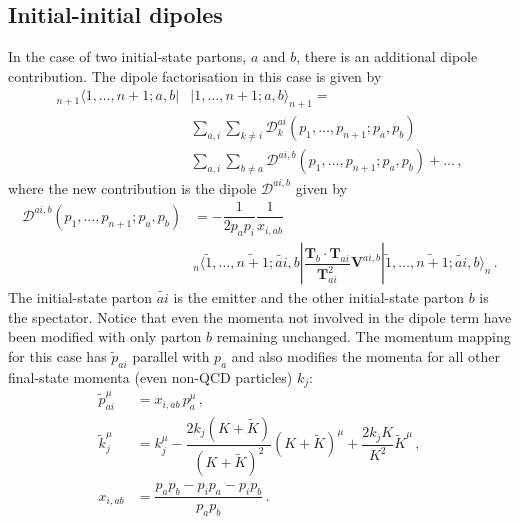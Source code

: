 \documentclass[main.tex]{subfiles}
\begin{document}
    \subsection{Initial-initial dipoles}
        In the case of two initial-state partons, $a$ and $b$, there
        is an additional dipole contribution. The dipole factorisation
        in this case is  given by
        \begin{equation}\label{eqn:II_factorisation}
            \begin{split}
                {}_{n+1} \langle 1, \ldots, n+1; a,b|&| 1, \ldots, n+1;a,b \rangle_{n+1} = \\
                &\sum_{a,i}\sum_{k \neq i} \mathcal{D}_{k}^{ai}(p_{1}, \ldots, p_{n+1};p_{a},p_{b}) \\
                &\sum_{a,i}\sum_{b \neq a} \mathcal{D}^{ai,b}(p_{1}, \ldots, p_{n+1};p_{a},p_{b}) + \ldots \, ,
            \end{split}
        \end{equation}
        where the new contribution is the dipole $\mathcal{D}^{ai,b}$ given by
        \begin{equation}\label{eqn:D_aib}
            \begin{split}
                \mathcal{D}^{ai,b}(p_{1},\ldots,p_{n+1};p_{a},p_{b}) &= -\dfrac{1}{2p_{a}p_{i}} \dfrac{1}{x_{i,ab}} \\
                &{}_{n}\langle \tilde{1}, \ldots, \widetilde{n+1}; \widetilde{ai}, b | \dfrac{\boldsymbol{T}_{b}\cdot\boldsymbol{T}_{ai}}{\boldsymbol{T}^{2}_{ai}}\boldsymbol{V}^{ai,b} | \tilde{1}, \ldots, \widetilde{n+1}; \widetilde{ai}, b \rangle_{n} \, .
            \end{split}
        \end{equation}
        The initial-state parton $\widetilde{ai}$ is the emitter and the
        other initial-state parton $b$ is the spectator. Notice that even the
        momenta not involved in the dipole term have been modified with only
        parton $b$ remaining unchanged. The momentum mapping for this case
        has $\tilde{p}_{ai}$ parallel with $p_{a}$ and also
        modifies the momenta for all other final-state momenta (even non-QCD particles) $k_{j}$:
        \begin{align}\label{eqn:II_mapping}
            \tilde{p}_{ai}^{\mu} &= x_{i,ab} \, p_{a}^{\mu} \, , \nonumber \\
            \tilde{k}_{j}^{\mu} &= k_{j}^{\mu} - \dfrac{2k_{j}(K+\widetilde{K})}{(K+\widetilde{K})^{2}}(K+\widetilde{K})^{\mu} + \dfrac{2k_{j}K}{K^{2}}\widetilde{K}^{\mu} \, , \\
            x_{i,ab} &= \dfrac{p_{a}p_{b} - p_{i}p_{a}-p_{i}p_{b}}{p_{a}p_{b}} \, . \nonumber
        \end{align}
\end{document}
